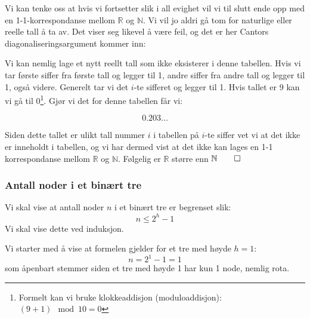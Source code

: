 Vi kan tenke oss at hvis vi fortsetter slik i all evighet vil vi til slutt ende opp med en 1-1-korrespondanse mellom $ \mathbb{R} $ og $ \mathbb{N} $. Vi vil jo aldri gå tom for naturlige eller reelle tall å ta av. Det viser seg likevel å være feil, og det er her Cantors diagonaliseringsargument kommer inn:

Vi kan nemlig lage et nytt reellt tall som ikke eksisterer i denne tabellen. Hvis vi tar første siffer fra første tall og legger til 1, andre siffer fra andre tall og legger til 1, også videre. Generelt tar vi det $ i $-te sifferet og legger til 1. Hvis tallet er 9 kan vi gå til 0\footnote{Formelt kan vi bruke klokkeaddisjon (moduloaddisjon): $ (9 + 1) \mod{10}  = 0 $}. Gjør vi det for denne tabellen får vi:

\[ 0.203...  \]

Siden dette tallet er ulikt tall nummer $ i $ i tabellen på $ i $-te siffer vet vi at det ikke er inneholdt i tabellen, og vi har dermed vist at det ikke kan lages en 1-1 korrespondanse mellom $ \mathbb{R} $ og $ \mathbb{N} $. Følgelig er $ \mathbb{R} $ større enn $ \mathbb{N} \hfill\qed$ 

\subsubsection{Antall noder i et binært tre}
Vi skal vise at antall noder $ n $ i et binært tre er begrenset slik:
\begin{equation*}
n \leq 2^{h} - 1
\end{equation*}
Vi skal vise dette ved induksjon.

Vi starter med å vise at formelen gjelder for et tre med høyde $ h=1 $:
\[ n = 2^1 - 1 = 1 \]
som åpenbart stemmer siden et tre med høyde 1 har kun 1 node, nemlig rota.

